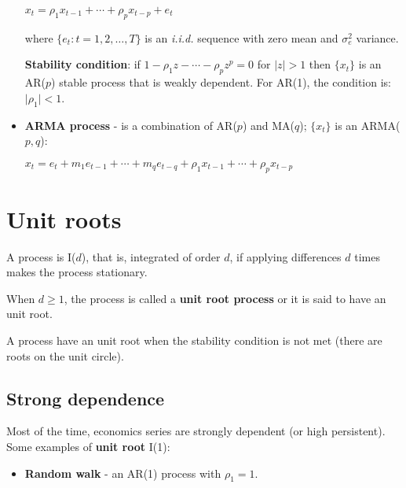 \documentclass[10pt, a4paper, landscape]{article}
\begin{document}
\begin{multicols}{3}
\begin{itemize}[leftmargin=*]
			\begin{center}
				$x_{t} = \rho_{1} x_{t - 1} + \cdots + \rho_{p} x_{t - p} + e_{t}$
			\end{center}
			
			where $\lbrace e_{t} : t = 1, 2, \ldots, T \rbrace$ is an \textsl{i.i.d.} sequence with zero mean and $\sigma^{2}_{e}$ variance.
			
			\textbf{Stability condition}: if $1 - \rho_{1} z - \cdots - \rho_{p} z^{p} = 0$ for $\lvert z \rvert > 1$ then $\lbrace x_{t} \rbrace$ is an AR($p$) stable process that is weakly dependent. For AR(1), the condition is: $\lvert \rho_{1} \rvert < 1$.
		
			\item \textbf{ARMA process} - is a combination of AR($p$) and MA($q$); $\lbrace x_{t} \rbrace$ is an ARMA($p, q$):
			
			\begin{center}
				$x_{t} = e_{t} + m_{1} e_{t - 1} + \cdots + m_{q} e_{t - q} + \rho_{1} x_{t - 1} + \cdots + \rho_{p} x_{t - p}$
			\end{center}
		\end{itemize}
		
		\columnbreak
		
		\section*{Unit roots}
		
		A process is I($d$), that is, integrated of order $d$, if applying differences $d$ times makes the process stationary.
		
		When $d \geq 1$, the process is called a \textbf{unit root process} or it is said to have an unit root.
		
		A process have an unit root when the stability condition is not met (there are roots on the unit circle).
		
		\subsection*{Strong dependence}
		
		Most of the time, economics series are strongly dependent (or high persistent). Some examples of \textbf{unit root} I(1):
		
		\begin{itemize}[leftmargin=*]
			\item \textbf{Random walk} - an AR(1) process with $\rho_{1} = 1$.
			

\end{itemize}
\end{multicols}
\end{document}
